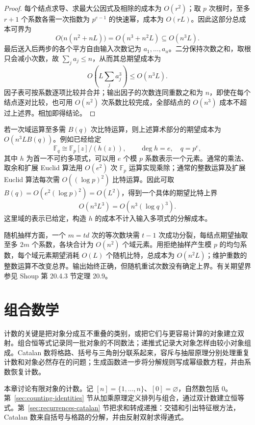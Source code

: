 \documentclass[lang=cn,a4paper,fontset=none,zihao=false,10pt,openany,twoside]{beautybook}
\numberwithin{algorithm}{chapter}
\begin{document}
\begin{proof}
每个结点求导、求最大公因式及相除的成本为 $O(r^2)$；取 $p$ 次根时，至多 $r+1$ 个系数各需一次指数为 $p^{e-1}$ 的快速幂，成本为 $O(rL)$。因此这部分总成本可界为
\[
 O\bigl(n(n^2+nL)\bigr)=O(n^3+n^2L)\subseteq O(n^3L).
\]
最后送入后两步的各个平方自由输入次数记为 $a_1,\ldots,a_u$。二分保持次数之和，取根只会减小次数，故 $\sum_j a_j\le n$，从而其总期望成本为
\[
 O\!\left(L\sum_j a_j^3\right)\le O(n^3L).
\]
因子表可按系数逐项比较并合并；输出因子的次数连同重数之和为 $n$，即使在每个结点逐对比较，也可用 $O(n^2)$ 次系数比较完成，全部结点的 $O(n^3)$ 成本不超过上述界。相加即得结论。
\end{proof}

\begin{remark}[从域运算次数到比特时间]
若一次域运算至多需 $B(q)$ 次比特运算，则上述算术部分的期望成本为 $O(n^3L B(q))$。例如已经给定
\[
 \mathbb F_q\cong\mathbb F_p[z]/(h(z)),\qquad \deg h=e,\quad q=p^e,
\]
其中 $h$ 为首一不可约多项式，可以用 $e$ 个模 $p$ 系数表示一个元素。通常的乘法、取余和扩展 Euclid 算法用 $O(e^2)$ 次 $\mathbb F_p$ 运算实现乘除；通常的整数运算及扩展 Euclid 算法每次需 $O((\log p)^2)$ 比特运算。因此可取 $B(q)=O(e^2(\log p)^2)=O(L^2)$，得到一个具体的期望比特上界
\[
 O(n^3L^3)=O(n^3(\log q)^3).
\]
这里域的表示已给定，构造 $h$ 的成本不计入输入多项式的分解成本。

随机抽样方面，一个 $m=td$ 次的等次数块需 $t-1$ 次成功分裂，每结点期望抽取至多 $2m$ 个系数，各块合计为 $O(n^2)$ 个域元素。用拒绝抽样产生模 $p$ 的均匀系数，每个域元素期望消耗 $O(L)$ 个随机比特，总成本为 $O(n^2L)$；维护重数的整数运算不改变总界。输出始终正确，但随机重试次数没有确定上界。有关期望界参见 Shoup 第 20.4.3 节定理 20.9。
\end{remark}


\FloatBarrier

\chapter{组合数学}\label{chap:combinatorics}
\begin{wenxintishi}
计数的关键是把对象分成互不重叠的类别，或把它们与更容易计算的对象建立双射。组合恒等式记录同一批对象的不同数法；递推式记录大对象怎样由较小对象组成。Catalan 数将格路、括号与三角剖分联系起来，容斥与抽屉原理分别处理重复计数和对象必然存在的问题；生成函数进一步将分解规则写成幂级数方程，并由系数恢复计数。
\end{wenxintishi}
本章讨论有限对象的计数。记 $[n]=\{1,\ldots,n\}$、$[0]=\varnothing$，自然数包括 $0$。第~\ref{sec:counting-identities} 节从加乘原理定义排列与组合，通过双计数建立恒等式。第~\ref{sec:recurrences-catalan} 节把求和转成递推：交错和引出特征根方法，Catalan 数来自括号与格路的分解，并由反射双射求得通式。
\end{document}

